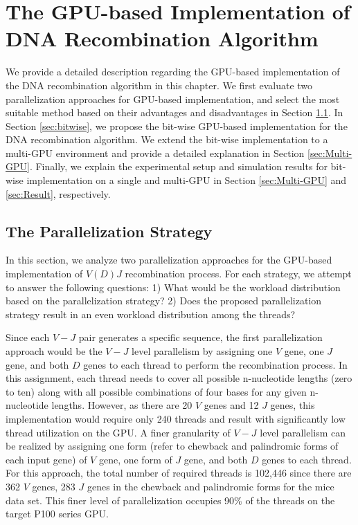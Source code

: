 \chapter{The GPU-based Implementation of DNA Recombination Algorithm}\label{Chapter:GPU}

We provide a detailed description regarding the GPU-based implementation of the DNA recombination algorithm in this chapter. We first evaluate two parallelization approaches for GPU-based implementation, and select the most suitable method based on their advantages and disadvantages in Section \ref{sec: Parallelization Strategy}. In Section \ref{sec:bitwise}, we propose the bit-wise GPU-based implementation for the DNA recombination algorithm. We extend the bit-wise implementation to a multi-GPU environment and provide a detailed explanation in Section \ref{sec:Multi-GPU}. Finally, we explain the experimental setup and simulation results for bit-wise implementation on a single and multi-GPU in Section \ref{sec:Multi-GPU} and \ref{sec:Result}, respectively.   
\section {The Parallelization Strategy}\label{sec: Parallelization Strategy}

In this section, we analyze two parallelization approaches for the GPU-based implementation of $V(D)J$ recombination process. For each strategy, we attempt to answer the following questions: 1) What would be the workload distribution based on the parallelization strategy? 2) Does the proposed parallelization strategy result in an even workload distribution among the threads? 


Since each $V-J$ pair generates a specific sequence, the first parallelization approach would be the $V-J$ level parallelism by assigning one $V$ gene, one $J$ gene, and both $D$ genes to each thread to perform the recombination process. In this assignment, each thread needs to cover all possible n-nucleotide lengths (zero to ten) along with all possible combinations of four bases for any given n-nucleotide lengths. However, as there are 20 $V$ genes and 12 $J$ genes, this implementation would require only 240 threads and result with significantly low thread utilization on the GPU. A finer granularity of $V-J$ level parallelism can be realized by assigning one form (refer to chewback and palindromic forms of each input gene) of $V$ gene, one form of $J$ gene, and both $D$ genes to each thread. For this approach, the total number of required threads is 102,446 since there are 362 $V$ genes, 283 $J$ genes in the chewback and palindromic forms for the mice data set.  This finer level of parallelization occupies 90\% of the threads on the target P100 series GPU. 

